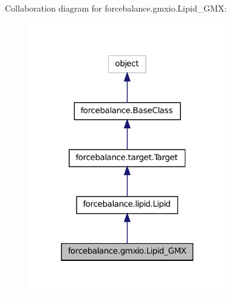 Collaboration diagram for forcebalance.\-gmxio.\-Lipid\-\_\-\-G\-M\-X\-:
\nopagebreak
\begin{figure}[H]
\begin{center}
\leavevmode
\includegraphics[width=242pt]{classforcebalance_1_1gmxio_1_1Lipid__GMX__coll__graph}
\end{center}
\end{figure}
